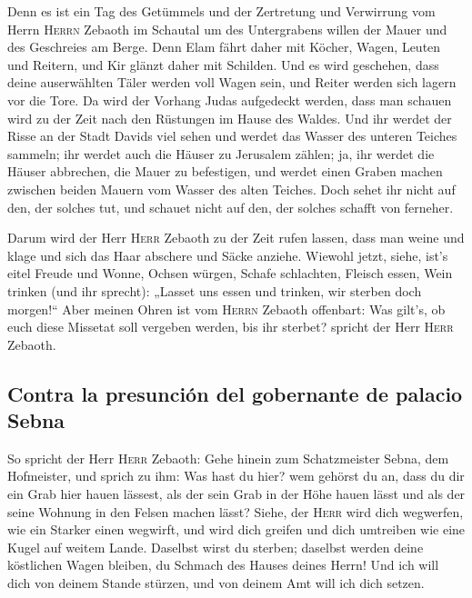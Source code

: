  Denn es ist ein Tag des Getümmels und der Zertretung und
Verwirrung vom Herrn \textsc{Herrn} Zebaoth im Schautal um des
Untergrabens willen der Mauer und des Geschreies am Berge.
 Denn Elam fährt daher mit Köcher, Wagen, Leuten und
Reitern, und Kir glänzt daher mit Schilden.  Und es wird
geschehen, dass deine auserwählten Täler werden voll Wagen sein, und
Reiter werden sich lagern vor die Tore.  Da wird der
Vorhang Judas aufgedeckt werden, dass man schauen wird zu der Zeit nach
den Rüstungen im Hause des Waldes.  Und ihr werdet der
Risse an der Stadt Davids viel sehen und werdet das Wasser des unteren
Teiches sammeln;  ihr werdet auch die Häuser zu Jerusalem
zählen; ja, ihr werdet die Häuser abbrechen, die Mauer zu befestigen,
 und werdet einen Graben machen zwischen beiden Mauern
vom Wasser des alten Teiches. Doch sehet ihr nicht auf den, der solches
tut, und schauet nicht auf den, der solches schafft von ferneher.

 Darum wird der Herr \textsc{Herr} Zebaoth zu der Zeit
rufen lassen, dass man weine und klage und sich das Haar abschere und
Säcke anziehe.  Wiewohl jetzt, siehe, ist's eitel Freude
und Wonne, Ochsen würgen, Schafe schlachten, Fleisch essen, Wein trinken
(und ihr sprecht): „Lasset uns essen und trinken, wir sterben doch
morgen!{}``  Aber meinen Ohren ist vom \textsc{Herrn}
Zebaoth offenbart: Was gilt's, ob euch diese Missetat soll vergeben
werden, bis ihr sterbet? spricht der Herr \textsc{Herr} Zebaoth.

\hypertarget{contra-la-presunciuxf3n-del-gobernante-de-palacio-sebna}{%
\subsection{Contra la presunción del gobernante de palacio
Sebna}\label{contra-la-presunciuxf3n-del-gobernante-de-palacio-sebna}}

 So spricht der Herr \textsc{Herr} Zebaoth: Gehe hinein
zum Schatzmeister Sebna, dem Hofmeister, und sprich zu ihm:
 Was hast du hier? wem gehörst du an, dass du dir ein
Grab hier hauen lässest, als der sein Grab in der Höhe hauen lässt und
als der seine Wohnung in den Felsen machen lässt?  Siehe,
der \textsc{Herr} wird dich wegwerfen, wie ein Starker einen wegwirft,
und wird dich greifen  und dich umtreiben wie eine Kugel
auf weitem Lande. Daselbst wirst du sterben; daselbst werden deine
köstlichen Wagen bleiben, du Schmach des Hauses deines Herrn!
 Und ich will dich von deinem Stande stürzen, und von
deinem Amt will ich dich setzen.

